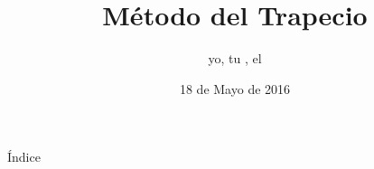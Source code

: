 \documentclass[compress]{beamer}
\title{Método del Trapecio}
\author[]{yo, tu , el}
\date{18 de Mayo de 2016}
\newcommand{\importsection}[1]{}           %
\begin{document}
	{
		\begin{frame}[plain]
			\titlepage 
		\end{frame}			
	}

	\importsection{Motivacion.tex}

	\begin{frame}{Índice}
		\hypertarget{index}{}
		\tableofcontents
	\end{frame}
	
	\importsection{DefinicionesPrevias.tex}

	\importsection{Trapecio.tex}

	\importsection{Conclusion.tex}
	
\end{document}
